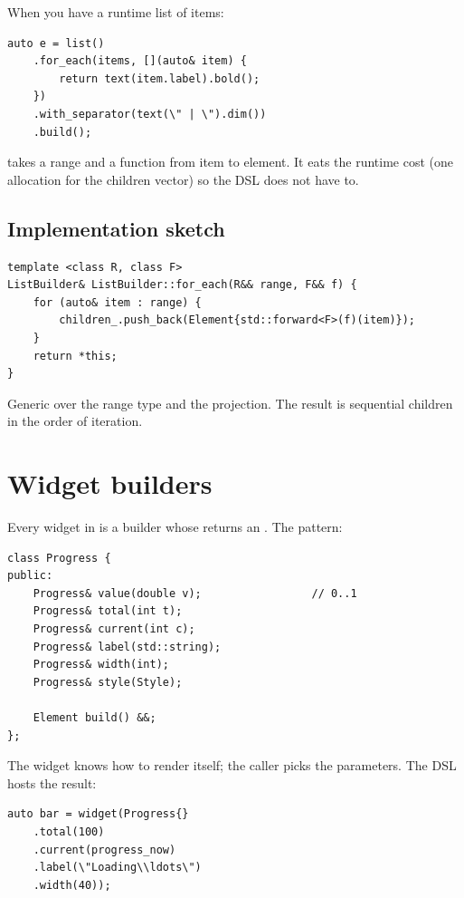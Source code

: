 When you have a runtime list of items:

\begin{lstlisting}
auto e = list()
    .for_each(items, [](auto& item) {
        return text(item.label).bold();
    })
    .with_separator(text(\" | \").dim())
    .build();
\end{lstlisting}

 takes a range and a function from
item to element. It eats the runtime cost (one allocation for
the children vector) so the DSL does not have to.

\subsection*{Implementation sketch}

\begin{lstlisting}
template <class R, class F>
ListBuilder& ListBuilder::for_each(R&& range, F&& f) {
    for (auto& item : range) {
        children_.push_back(Element{std::forward<F>(f)(item)});
    }
    return *this;
}
\end{lstlisting}

Generic over the range type and the projection. The result is
sequential children in the order of iteration.

\section{Widget builders}

Every widget in  is a builder
whose  returns an . The pattern:

\begin{lstlisting}
class Progress {
public:
    Progress& value(double v);                 // 0..1
    Progress& total(int t);
    Progress& current(int c);
    Progress& label(std::string);
    Progress& width(int);
    Progress& style(Style);

    Element build() &&;
};
\end{lstlisting}

The widget knows how to render itself; the caller picks the
parameters. The DSL hosts the result:

\begin{lstlisting}
auto bar = widget(Progress{}
    .total(100)
    .current(progress_now)
    .label(\"Loading\\ldots\")
    .width(40));
\end{lstlisting}

